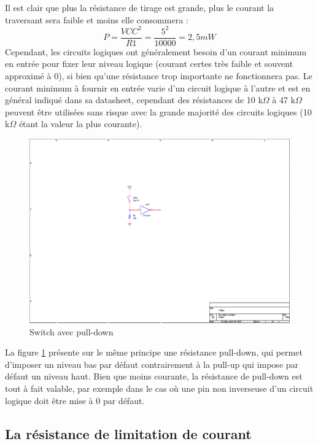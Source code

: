 \documentclass[a4paper]{article}
\begin{document}
\par
Il est clair que plus la résistance de tirage est grande, plus le courant la traversant sera faible et moins elle consommera :
\[P = \frac{VCC^{2}}{R1} = \frac{5^{2}}{10000} = 2,5 mW\]
Cependant, les circuits logiques ont généralement besoin d'un courant minimum en entrée pour fixer leur niveau logique (courant certes très faible et souvent approximé à 0), si bien qu'une résistance trop importante ne fonctionnera pas. Le courant minimum à fournir en entrée varie d'un circuit logique à l'autre et est en général indiqué dans sa datasheet, cependant des résistances de 10 k$\Omega$ à 47 k$\Omega$ peuvent être utilisées sans risque avec la grande majorité des circuits logiques (10 k$\Omega$ étant la valeur la plus courante).

\begin{figure}[H]
	\centering
	\includegraphics[scale=1.00]{Images/Switch_avec_pull-down}
	\caption{Switch avec pull-down
		\label{Switch_avec_pull-down}}
\end{figure}

La figure \ref{Switch_avec_pull-down} présente sur le même principe une résistance pull-down, qui permet d'imposer un niveau bas par défaut contrairement à la pull-up qui impose par défaut un niveau haut. Bien que moins courante, la résistance de pull-down est tout à fait valable, par exemple dans le cas où une pin non inverseuse d'un circuit logique doit être mise à 0 par défaut.

\subsection{La résistance de limitation de courant}
\end{document}
